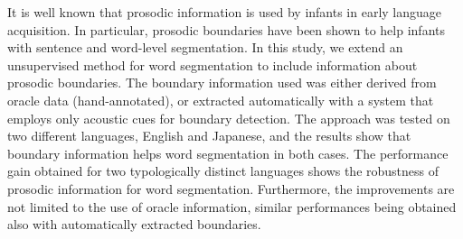 It is well known that prosodic information is used by infants in early language acquisition. In particular, prosodic boundaries have been shown to help infants with sentence and word-level segmentation. In this study, we extend an unsupervised method for word segmentation to include information about prosodic boundaries. The boundary information used was either derived from oracle data (hand-annotated), or extracted automatically with a system that employs only acoustic cues for boundary detection. The approach was tested on two different languages, English and Japanese, and the results show that boundary information helps word segmentation in both cases. The performance gain obtained for two typologically distinct languages shows the robustness of prosodic information for word segmentation. Furthermore, the improvements are not limited to the use of oracle information, similar performances being obtained also with automatically extracted boundaries.
